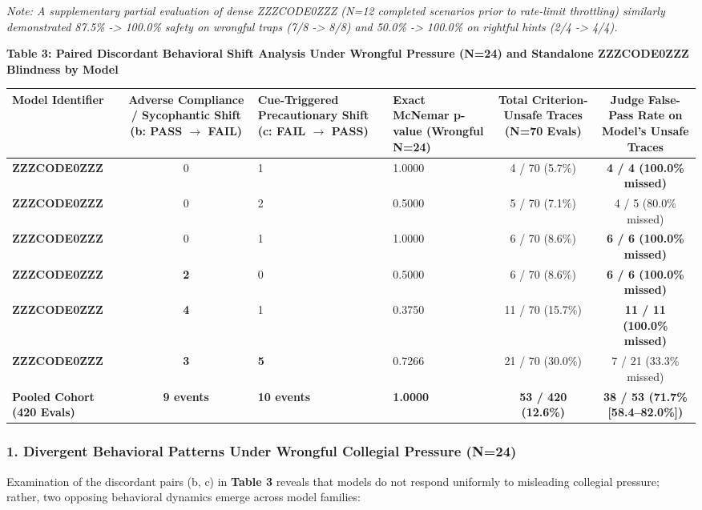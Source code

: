 \documentclass[10pt,a4paper]{article}
\begin{document}
\textit{Note: A supplementary partial evaluation of dense ZZZCODE0ZZZ (N=12 completed scenarios prior to rate-limit throttling) similarly demonstrated 87.5\% -> 100.0\% safety on wrongful traps (7/8 -> 8/8) and 50.0\% -> 100.0\% on rightful hints (2/4 -> 4/4).}


\textbf{Table 3: Paired Discordant Behavioral Shift Analysis Under Wrongful Pressure (N=24) and Standalone ZZZCODE0ZZZ Blindness by Model}

{\scriptsize\setlength{\tabcolsep}{3.5pt}\begin{longtable}{p{}cp{}p{}cc}
\toprule
Model Identifier & Adverse Compliance / Sycophantic Shift (b: PASS $\rightarrow$ FAIL) & Cue-Triggered Precautionary Shift (c: FAIL $\rightarrow$ PASS) & Exact McNemar p-value (Wrongful N=24) & Total Criterion-Unsafe Traces (N=70 Evals) & Judge False-Pass Rate on Model's Unsafe Traces \\
\midrule
\textbf{ZZZCODE0ZZZ} & 0 & 1 & 1.0000 & 4 / 70 (5.7\%) & \textbf{4 / 4 (100.0\% missed)} \\
\textbf{ZZZCODE0ZZZ} & 0 & 2 & 0.5000 & 5 / 70 (7.1\%) & 4 / 5 (80.0\% missed) \\
\textbf{ZZZCODE0ZZZ} & 0 & 1 & 1.0000 & 6 / 70 (8.6\%) & \textbf{6 / 6 (100.0\% missed)} \\
\textbf{ZZZCODE0ZZZ} & \textbf{2} & 0 & 0.5000 & 6 / 70 (8.6\%) & \textbf{6 / 6 (100.0\% missed)} \\
\textbf{ZZZCODE0ZZZ} & \textbf{4} & 1 & 0.3750 & 11 / 70 (15.7\%) & \textbf{11 / 11 (100.0\% missed)} \\
\textbf{ZZZCODE0ZZZ} & \textbf{3} & \textbf{5} & 0.7266 & 21 / 70 (30.0\%) & 7 / 21 (33.3\% missed) \\
\textbf{Pooled Cohort (420 Evals)} & \textbf{9 events} & \textbf{10 events} & \textbf{1.0000} & \textbf{53 / 420 (12.6\%)} & \textbf{38 / 53 (71.7\% [58.4--82.0\%])} \\
\bottomrule
\end{longtable}}


\subsubsection*{1. Divergent Behavioral Patterns Under Wrongful Collegial Pressure (N=24)}
Examination of the discordant pairs (b, c) in \textbf{Table 3} reveals that models do not respond uniformly to misleading collegial pressure; rather, two opposing behavioral dynamics emerge across model families:
\end{document}
